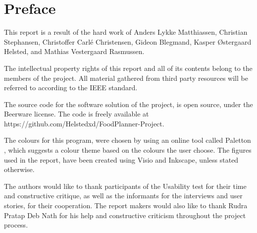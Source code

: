 \chapter*{Preface} \label{PrefaceLabel}

This report is a result of the hard work of Anders Lykke Matthiassen, Christian Stephansen, Christoffer Carlé Christensen, Gideon Blegmand, Kasper Østergaard Helsted, and Mathias Vestergaard Rasmussen.

The intellectual property rights of this report and all of its contents belong to the members of the project. All material gathered from third party resources will be referred to according to the IEEE standard.

The source code for the software solution of the project, is open source, under the Beerware license. The code is freely available at https://github.com/Helstedxd/FoodPlanner-Project.

The colours for this program, were chosen by using an online tool called Paletton \cite{paletton}, which suggests a colour theme based on the colours the user choose. The figures used in the report, have been created using Visio and Inkscape, unless stated otherwise.

The authors would like to thank participants of the Usability test for their time and constructive critique, as well as the informants for the interviews and user stories, for their cooperation. The report makers would also like to thank Rudra Pratap Deb Nath for his help and constructive criticism throughout the project process.

\begin{multicols}{2}
\signature{Anders Lykke Matthiassen}
\signature{Christian Stephansen}
\signature{Christoffer Carlé Christensen}
\signature{Gideon Blegmand}
\signature{Kasper Østergaard Helsted}
\signature{Mathias Vestergaard Rasmussen}
\end{multicols}